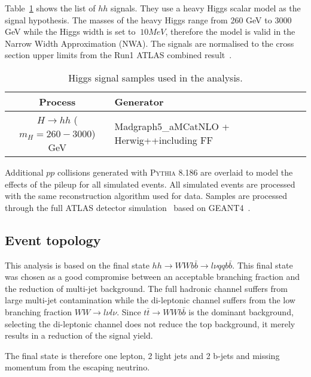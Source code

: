 Table~\ref{tabular:mc_samples_hh} shows the list of $hh$ signals. 
They use a heavy Higgs scalar model as the signal hypothesis. The 
masses of the heavy Higgs range from 260 GeV to 3000 GeV while
the Higgs width is set to $~10 MeV$, therefore the model is valid in
the Narrow Width Approximation (NWA). The signals are normalised to the cross section upper limits from the Run1 ATLAS combined result~\cite{Aad:2015xja}. 


\begin{table}[!htb]
\caption{Higgs signal samples used in the analysis. }
\label{tabular:mc_samples_hh}
\begin{center}
\begin{tabular}{|c|l|c|c|c|c|r|}
	\hline
 Process                                    & Generator    \\ \hline
$H \to hh$ ($m_H =260 - 3000$) GeV & Madgraph5\_aMCatNLO +
                                     Herwig++including FF \\
\hline
\end{tabular}
\end{center}
\end{table}


Additional $pp$ collisions generated with \textsc{Pythia} 8.186 are
overlaid to model the effects of the pileup for all simulated
events. All simulated events are processed with the same
reconstruction algorithm used for data. Samples are processed
through the full ATLAS detector simulation~\cite{Aad:2010ah} based 
on \textsc{GEANT4}~\cite{Agostinelli:2002hh}.


\subsection{Event topology}
This analysis is based on the final state 
$hh \to WWb\bar{b} \to l \nu qq b\bar{b}$. This final state was 
chosen as a good compromise between an acceptable branching 
fraction and the reduction of multi-jet background. The full 
hadronic channel suffers from large multi-jet contamination 
while the di-leptonic channel suffers from the low branching
fraction $WW \to l \nu l \nu$. Since  $t \bar{t} \to WWb\bar{b}$ 
is the dominant background, selecting the di-leptonic channel does
not reduce the top background, it merely results in a reduction 
of the signal yield.

The final state is therefore one lepton, 2 light jets and 2 b-jets and
missing momentum from the escaping neutrino.

\clearpage




